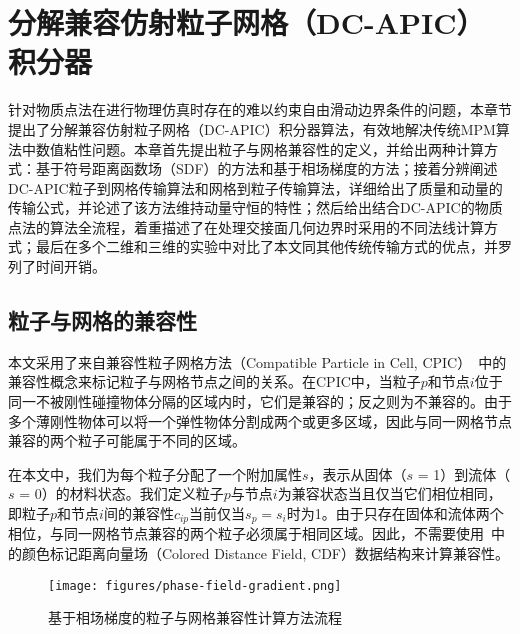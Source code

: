 \chapter{分解兼容仿射粒子网格（DC-APIC）积分器} \label{chap:dcapic}
针对物质点法在进行物理仿真时存在的难以约束自由滑动边界条件的问题，本章节提出了分解兼容仿射粒子网格（DC-APIC）积分器算法，有效地解决传统MPM算法中数值粘性问题。本章首先提出粒子与网格兼容性的定义，并给出两种计算方式：基于符号距离函数场（SDF）的方法和基于相场梯度的方法；接着分辨阐述DC-APIC粒子到网格传输算法和网格到粒子传输算法，详细给出了质量和动量的传输公式，并论述了该方法维持动量守恒的特性；然后给出结合DC-APIC的物质点法的算法全流程，着重描述了在处理交接面几何边界时采用的不同法线计算方式；最后在多个二维和三维的实验中对比了本文同其他传统传输方式的优点，并罗列了时间开销。

\section{粒子与网格的兼容性}
本文采用了来自兼容性粒子网格方法（Compatible Particle in Cell, CPIC）~\cite{hu2018moving}中的兼容性概念来标记粒子与网格节点之间的关系。在CPIC中，当粒子$p$和节点$i$位于同一不被刚性碰撞物体分隔的区域内时，它们是兼容的；反之则为不兼容的。由于多个薄刚性物体可以将一个弹性物体分割成两个或更多区域，因此与同一网格节点兼容的两个粒子可能属于不同的区域。

在本文中，我们为每个粒子分配了一个附加属性$s$，表示从固体（$s$ = 1）到流体（$s$ = 0）的材料状态。我们定义粒子$p$与节点$i$为兼容状态当且仅当它们相位相同，即粒子$p$和节点$i$间的兼容性$c_{ip}$当前仅当$s_p = s_i$时为1。由于只存在固体和流体两个相位，与同一网格节点兼容的两个粒子必须属于相同区域。因此，不需要使用~\cite{hu2018moving}中的颜色标记距离向量场（Colored Distance Field, CDF）数据结构来计算兼容性。

\begin{figure}[htbp]
    \centering
    \texttt{[image: figures/phase-field-gradient.png]}
    \caption{基于相场梯度的粒子与网格兼容性计算方法流程}
    \label{fig:phase-field-gradient}
\end{figure}

